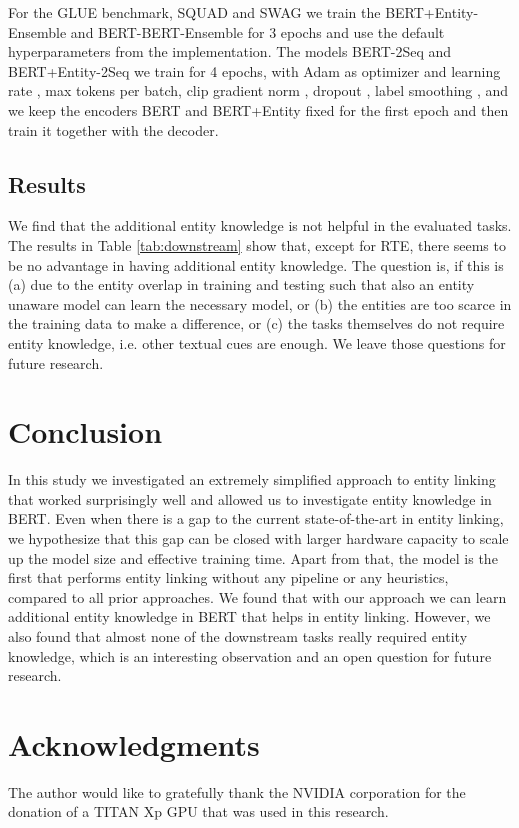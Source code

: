 \documentclass[11pt,a4paper]{article}
\begin{document}
For the GLUE benchmark, SQUAD and SWAG we train the BERT+Entity-Ensemble and BERT-BERT-Ensemble for 3 epochs and use the default hyperparameters from the implementation. The models BERT-2Seq and BERT+Entity-2Seq we train for 4 epochs, with Adam as optimizer and learning rate , max  tokens per batch, clip gradient norm , dropout , label smoothing , and we keep the encoders BERT and BERT+Entity fixed for the first epoch and then train it together with the decoder.  

\subsection{Results}
We find that the additional entity knowledge is not helpful in the evaluated tasks. The results in Table \ref{tab:downstream} show that, except for RTE, there seems to be no advantage in having additional entity knowledge. The question is, if this is (a) due to the entity overlap in training and testing such that also an entity unaware model can learn the necessary model, or (b) the entities are too scarce in the training data to make a difference, or (c) the tasks themselves do not require entity knowledge, i.e. other textual cues are enough. We leave those questions for future research.  

\section{Conclusion}

In this study we investigated an extremely simplified approach to entity linking that worked surprisingly well and allowed us to investigate entity knowledge in BERT. Even when there is a gap to the current state-of-the-art in entity linking, we hypothesize that this gap can be closed with larger hardware capacity to scale up the model size and effective training time. Apart from that, the model is the first that performs entity linking without any pipeline or any heuristics, compared to all prior approaches. We found that with our approach we can learn additional entity knowledge in BERT that helps in entity linking. However, we also found that almost none of the downstream tasks really required entity knowledge, which is an interesting observation and an open question for future research.  

\section*{Acknowledgments}

The author would like to gratefully thank the NVIDIA corporation for the donation of a TITAN Xp GPU that was used in this research.




\appendix
\end{document}

